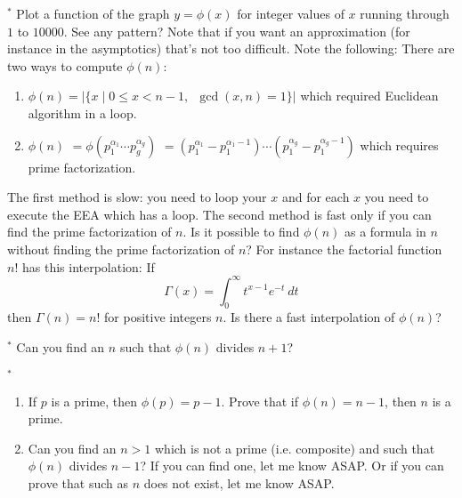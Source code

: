 \begin{ex} $^*$
Plot a function of the graph $y = \phi(x)$ for integer values of $x$
running through $1$ to $10000$.
See any pattern? Note that if you want an approximation (for instance
in the asymptotics) that's not too difficult.
Note the following:
There are two ways to compute $\phi(n)$:
\begin{enumerate}[nosep,label=\textnormal{(\alph*)}]
\item $\phi(n) = |\{x \mid 0 \leq x < n - 1, \,\,\, \gcd(x, n) = 1\}|$
  which required Euclidean algorithm in a loop.
\item
  $\phi(n)$
  $= \phi(p_1^{\alpha_1} \cdots p_g^{\alpha_g})$
  $= (p_1^{\alpha_1} - p_1^{\alpha_1 - 1}) \cdots (p_1^{\alpha_g} - p_1^{\alpha_g - 1})$
  which requires prime factorization.
\end{enumerate}
The first method is slow: you need to loop your $x$ and for each $x$ you need to
execute the EEA which has a loop.
The second method is fast only if you can find the prime
factorization of $n$.
Is it possible to find $\phi(n)$ as a formula in $n$ without finding the
prime factorization of $n$?
For instance the factorial function $n!$ has this interpolation:
If
\[
\Gamma(x) = \int_0^\infty t^{x-1} e^{-t} \ dt
\]
then $\Gamma(n) = n!$ for positive integers $n$.
Is there a fast interpolation of $\phi(n)$? 
\end{ex}


\begin{ex}$^*$
  Can you find an $n$ such that $\phi(n)$ divides $n + 1$?
\end{ex}


\begin{ex}$^*$
  \begin{enumerate}[nosep,label=\textnormal{(\alph*)}]
  \item If $p$ is a prime, then $\phi(p) = p - 1$.
    Prove that if $\phi(n) = n - 1$, then $n$ is a prime.
  \item
    Can you find an $n > 1$ which is not a prime (i.e. composite)
    and such that
    $\phi(n)$ divides $n - 1$?
    If you can find one, let me know ASAP.
    Or if you can prove that such as $n$ does not exist, let me know ASAP.
  \end{enumerate}
\end{ex}

